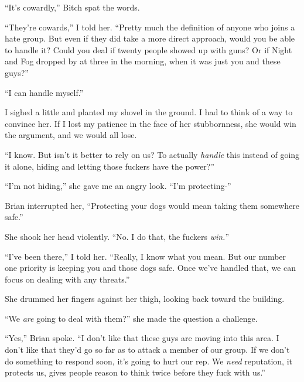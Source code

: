 ``It's cowardly,'' Bitch spat the words.



``They're cowards,'' I told her.  ``Pretty much the definition of anyone who joins a hate group.  But even if they did take a more direct approach, would you be able to handle it?  Could you deal if twenty people showed up with guns?  Or if Night and Fog dropped by at three in the morning, when it was just you and these guys?''



``I can handle myself.''



I sighed a little and planted my shovel in the ground.  I had to think of a way to convince her.  If I lost my patience in the face of her stubbornness, she would win the argument, and we would all lose.



``I know.  But isn't it better to rely on us?  To actually \emph{handle} this instead of going it alone, hiding and letting those fuckers have the power?''



``I'm not hiding,'' she gave me an angry look.  ``I'm protecting-''



Brian interrupted her, ``Protecting your dogs would mean taking them somewhere safe.''



She shook her head violently.  ``No.  I do that, the fuckers \emph{win.}''



``I've been there,'' I told her.  ``Really, I know what you mean.  But our number one priority is keeping you and those dogs safe.  Once we've handled that, we can focus on dealing with any threats.''



She drummed her fingers against her thigh, looking back toward the building.



``We \emph{are} going to deal with them?'' she made the question a challenge.



``Yes,'' Brian spoke.  ``I don't like that these guys are moving into this area.  I don't like that they'd go so far as to attack a member of our group.  If we don't do something to respond soon, it's going to hurt our rep.  We \emph{need} reputation, it protects us, gives people reason to think twice before they fuck with us.''



